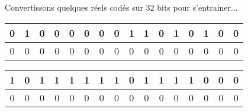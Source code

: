 \documentclass[12pt]{article}
\begin{document}
		\begin{MonExo}
		Convertissons quelques réels codés sur 32 bits pour s'entrainer...
		\begin{alphenum}
			\item
				\begin{tabular}{|c|c|c|c|c|c|c|c|c|c|c|c|c|c|c|c|} %
					\hline
					0&1&0&0&0&0&0&0&1&1&0&1&0&1&0&0 \\
					\hline
					0&0&0&0&0&0&0&0&0&0&0&0&0&0&0&0 \\
					\hline
				\end{tabular}
			\item
				\begin{tabular}{|c|c|c|c|c|c|c|c|c|c|c|c|c|c|c|c|} %
					\hline
					1&0&1&1&1&1&1&1&0&1&1&1&1&0&0&0 \\
					\hline
					0&0&0&0&0&0&0&0&0&0&0&0&0&0&0&0 \\
					\hline
				\end{tabular}
		\end{alphenum}
	\end{MonExo}
\end{document}
